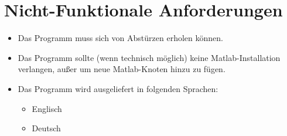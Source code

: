 \section{Nicht-Funktionale Anforderungen}

\begin{itemize}
\item Das Programm muss sich von Abstürzen erholen können.
\item Das Programm sollte (wenn technisch möglich) keine Matlab-Installation verlangen, außer um neue Matlab-Knoten hinzu zu fügen.
\item Das Programm wird ausgeliefert in folgenden Sprachen:
	\begin{itemize}
	\item Englisch
	\item Deutsch
	\end{itemize}
\end{itemize}